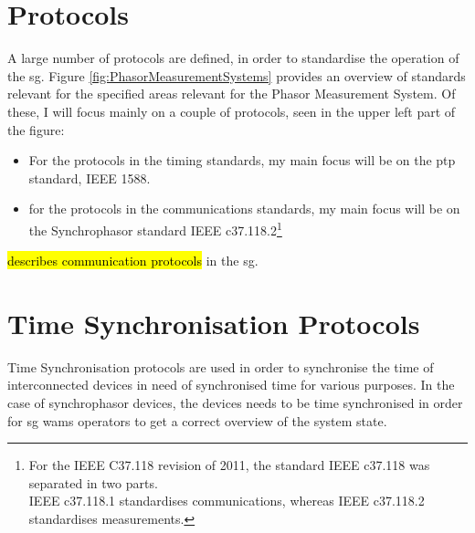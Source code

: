 \section{Protocols}
A large number of protocols are defined, in order to standardise the operation of the \acrlong{sg}.
Figure \ref{fig:PhasorMeasurementSystems} provides an overview of standards relevant for the specified areas relevant for the Phasor Measurement System.
Of these, I will focus mainly on a couple of protocols, seen in the upper left part of the figure:
\begin{itemize}
    \item For the protocols in the timing standards, my main focus will be on the \acrfull{ptp} standard, IEEE 1588.
    \item for the protocols in the communications standards, my main focus will be on the Synchrophasor standard IEEE c37.118.2\footnote{For the IEEE C37.118 revision of 2011, the standard IEEE c37.118 was separated in two parts.\\ IEEE c37.118.1 standardises communications, whereas IEEE c37.118.2 standardises measurements.}
\end{itemize}

\cite{2021arXiv210311657E} \hl{describes communication protocols} in the  \acrshort{sg}.













\section{Time Synchronisation Protocols}


Time Synchronisation protocols are used in order to synchronise the time of interconnected devices in need of synchronised time for various purposes. In the case of synchrophasor devices, the devices needs to be time synchronised in order for \acrshort{sg} \acrshort{wams} operators to get a correct overview of the system state.

